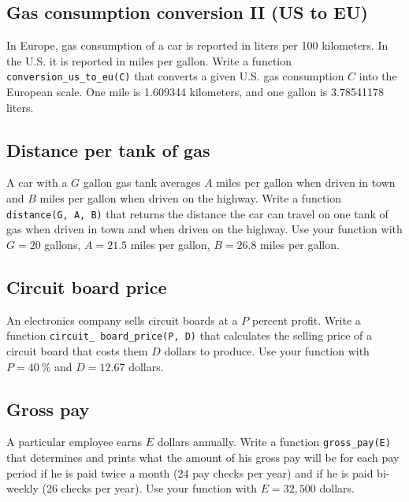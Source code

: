 
\subsection{Gas consumption conversion II (US to EU)}

In Europe, gas consumption of a car is reported in liters per 100 kilometers. In the U.S. 
it is reported in miles per gallon. Write a function {\tt conversion\_us\_to\_eu(C)} that converts a given U.S. gas 
consumption $C$ into the European scale. One mile is 1.609344 kilometers, and one gallon is 3.78541178 liters. 


\subsection{Distance per tank of gas}

A car with a $G$ gallon gas tank averages $A$ miles per gallon 
when driven in town and 
$B$ miles per gallon when driven on the highway. Write a function {\tt distance(G, A, B)} 
that returns the distance the car can travel on one tank of gas when driven in town and when driven on the highway. 
Use your function with $G = 20$ gallons, $A = 21.5$ miles per gallon, $B = 26.8$ miles per gallon. 


\subsection{Circuit board price}

An electronics company sells circuit boards at a $P$ percent profit. 
Write a function {\tt circuit\_ board\_price(P, D)} 
that calculates the selling price of a circuit board that costs them $D$ dollars to
produce. Use your function with $P = 40\ \%$ and $D = 12.67$ dollars.


\subsection{Gross pay}

A particular employee earns $E$ dollars annually. Write a function 
{\tt gross\_pay(E)} that determines and prints what the amount of his gross pay will be for each pay period 
if he is paid twice a month (24 pay checks per year) and if he is paid bi-weekly (26 checks per 
year). Use your function with $E = 32,500$ dollars.


